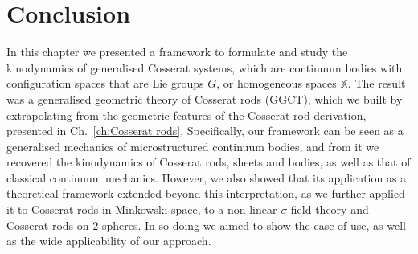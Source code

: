 \section{Conclusion}

In this chapter we presented a framework to formulate and study the kinodynamics of generalised Cosserat systems, which are continuum bodies with configuration spaces that are Lie groups $G$, or homogeneous spaces $\mathbb{X}$. The result was a generalised geometric theory of Cosserat rods (GGCT), which we built by extrapolating from the geometric features of the Cosserat rod derivation, presented in Ch.~\ref{ch:Cosserat rods}. Specifically, our framework can be seen as a generalised mechanics of microstructured continuum bodies, and from it we recovered the kinodynamics of Cosserat rods, sheets and bodies, as well as that of classical continuum mechanics. However, we also showed that its application as a theoretical framework extended beyond this interpretation, as we further applied it to Cosserat rods in Minkowski space, to a non-linear $\sigma$ field theory and Cosserat rods on $2$-spheres. In so doing we aimed to show the ease-of-use, as well as the wide applicability of our approach.

